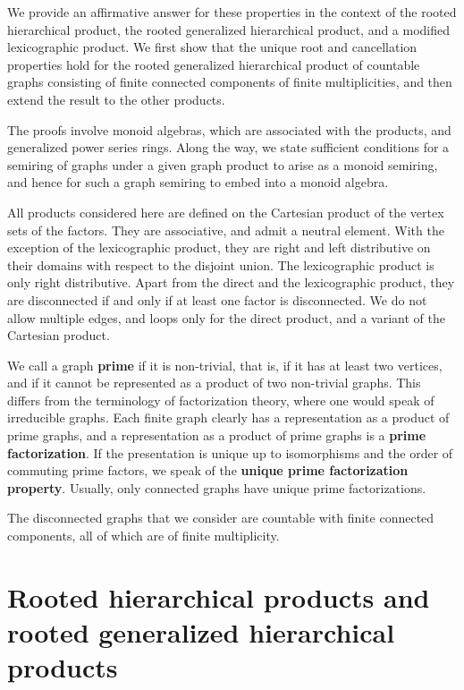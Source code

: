 \documentclass{amsart}
\theoremstyle{plain}
\theoremstyle{definition}
\newcommand{\defit}[1]{\textbf{#1}}
\begin{document}
We provide an affirmative answer for these properties in the context of the rooted hierarchical product, the rooted generalized hierarchical product, and a modified lexicographic product.
We first show that the unique root and cancellation properties hold for the rooted generalized hierarchical product of countable graphs consisting of finite connected components of finite multiplicities,  and then extend the result to the other products.

The proofs involve monoid algebras, which are associated with the products, and generalized power series rings.
Along the way, we state sufficient conditions for a semiring of graphs under a given graph product to arise as a monoid semiring, and hence for such a graph semiring to embed into a monoid algebra.

All products considered here are defined on the Cartesian product of the vertex sets of the factors.
They are associative, and admit a neutral element. With the exception of the lexicographic product, they are right and left distributive on their domains with respect to the disjoint union. The lexicographic product is only right distributive.  Apart from the direct and the lexicographic product, they are disconnected if and only if at least one factor is disconnected.
We do not allow multiple edges,  and loops only for the direct product, and a variant of the Cartesian product.

We call a  graph \defit{prime} if it is non-trivial, that is, if it has at least two vertices,  and if it cannot be represented as a product of two non-trivial graphs. This differs from the  terminology of factorization theory, where one would speak of irreducible graphs.  Each finite graph clearly has a representation as a product of prime graphs,  and a representation as a product of prime graphs is a \defit{prime factorization}. If the presentation is unique up to isomorphisms and the order of commuting prime factors, we speak of the \defit{unique prime factorization property}.
Usually, only connected graphs have unique prime factorizations.

The disconnected graphs that we consider are countable with finite connected components, all of which are of finite multiplicity.




\section{Rooted hierarchical products and rooted generalized  hierarchical products}\label{sec:graphproducts}
\end{document}
